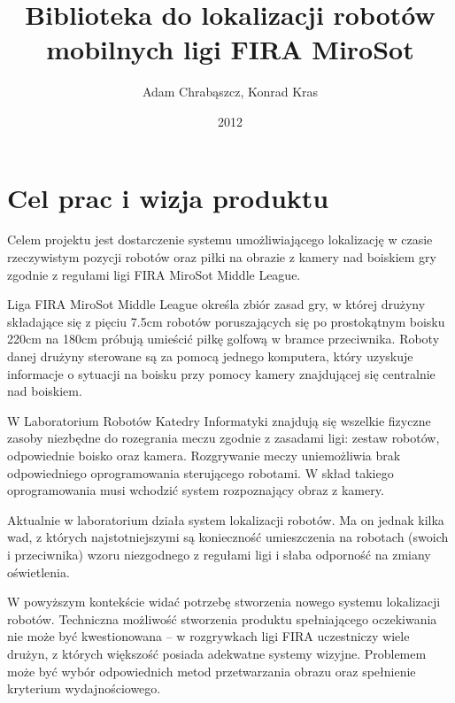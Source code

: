 \documentclass[polish,12pt]{aghthesis}
\author{Adam Chrabąszcz, Konrad Kras}
\title{Biblioteka do lokalizacji robotów mobilnych ligi FIRA MiroSot}
\date{2012}
\begin{document}
\maketitle



\section{Cel prac i wizja produktu}
\label{sec:cel-wizja}
Celem projektu jest
dostarczenie systemu umożliwiającego lokalizację w czasie rzeczywistym
pozycji robotów oraz piłki na obrazie z kamery nad boiskiem gry zgodnie z
regułami ligi FIRA MiroSot Middle League.

Liga FIRA MiroSot Middle League określa zbiór zasad gry, w której drużyny
składające się z pięciu 7.5cm robotów poruszających się po prostokątnym boisku
220cm na 180cm próbują umieścić piłkę golfową w bramce przeciwnika. Roboty danej
drużyny sterowane są za pomocą jednego komputera, który uzyskuje informacje
o sytuacji na boisku przy pomocy kamery znajdującej się centralnie nad boiskiem.

W Laboratorium Robotów Katedry Informatyki znajdują się wszelkie fizyczne zasoby
niezbędne do rozegrania meczu zgodnie z zasadami ligi: zestaw robotów, 
odpowiednie boisko oraz kamera. Rozgrywanie meczy uniemożliwia brak
odpowiedniego oprogramowania sterującego robotami. W skład takiego
oprogramowania musi wchodzić system rozpoznający obraz z kamery.

Aktualnie w laboratorium działa system lokalizacji robotów. Ma on jednak kilka
wad, z których najstotniejszymi są konieczność umieszczenia na robotach
(swoich i przeciwnika) wzoru niezgodnego z regułami ligi
i słaba odporność na zmiany oświetlenia. 

W powyższym kontekście widać potrzebę stworzenia nowego systemu lokalizacji 
robotów. Techniczna możliwość stworzenia produktu spełniającego oczekiwania nie
może być kwestionowana -- w rozgrywkach ligi FIRA uczestniczy wiele drużyn, 
z których większość posiada adekwatne systemy wizyjne. Problemem może być wybór
odpowiednich metod przetwarzania obrazu oraz spełnienie kryterium
wydajnościowego.
\end{document}
